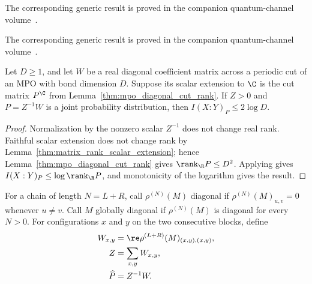 The corresponding generic result is proved in the companion quantum-channel volume~\cite[``Entropy is bounded by the logarithm of the support cardinality'']{QICLean2026Blueprint}.



The corresponding generic result is proved in the companion quantum-channel volume~\cite[``Classical mutual information is bounded by ordinary rank'']{QICLean2026Blueprint}.


\begin{lemma}
    \label{thm:mpo_diagonal_cut_classical_mutual_information}
    \leanok
    Let $D\geq1$, and let $W$ be a real diagonal coefficient matrix across a
    periodic cut of an MPO with bond dimension $D$. Suppose its scalar
    extension to $\C$ is the cut matrix $P^{\C}$ from
    Lemma~\ref{thm:mpo_diagonal_cut_rank}.
    If $Z>0$ and $P=Z^{-1}W$ is a joint probability distribution, then
    $I(X:Y)_P\leq2\log D$.
\end{lemma}
\begin{proof}\leanok
    Normalization by the nonzero scalar $Z^{-1}$ does not change real rank.
    Faithful scalar extension does not change rank by
    Lemma~\ref{thm:matrix_rank_scalar_extension}; hence
    Lemma~\ref{thm:mpo_diagonal_cut_rank} gives
    $\rank_{\R}P\leq D^2$.
    Applying \cite[``Classical mutual information is bounded by ordinary rank'']{QICLean2026Blueprint} gives
    $I(X:Y)_P\leq\log\rank_{\R}P$, and monotonicity of the
    logarithm gives the result.
\end{proof}

\begin{definition}
    \label{def:mpo_normalized_diagonal_cut_distribution}
    \leanok
    For a chain of length $N=L+R$, call $\rho^{(N)}(M)$ diagonal if
    $\rho^{(N)}(M)_{u,v}=0$ whenever $u\ne v$. Call $M$ globally diagonal if
    $\rho^{(N)}(M)$ is diagonal for every $N>0$. For configurations $x$ and
    $y$ on the two consecutive blocks, define
    \begin{align}
        W_{x,y}    & =\re\rho^{(L+R)}(M)_{(x,y),(x,y)},
        \notag                                          \\
        Z          & =\sum_{x,y}W_{x,y},
        \notag                                          \\
        \widehat P & =Z^{-1}W.
        \notag
    \end{align}
\end{definition}

